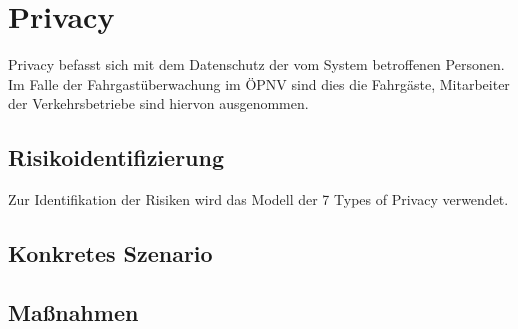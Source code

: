 \section{Privacy}
Privacy befasst sich mit dem Datenschutz der vom System betroffenen Personen. Im Falle der Fahrgastüberwachung im ÖPNV sind dies die Fahrgäste, Mitarbeiter der Verkehrsbetriebe sind hiervon ausgenommen.
\subsection{Risikoidentifizierung}
Zur Identifikation der Risiken wird das Modell der \glqq{}7 Types of Privacy\grqq{} verwendet.
\newpage
\subsection{Konkretes Szenario}
\newpage
\subsection{Maßnahmen}